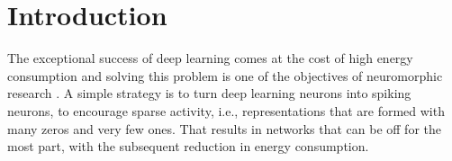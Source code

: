 

\section{Introduction}





The exceptional success of deep learning comes at the cost of high energy consumption \cite{henderson2020towards} and solving this problem is one of the objectives of neuromorphic research \cite{blouw2019benchmarking, 9395703}. 
A simple strategy is to turn deep learning neurons into spiking neurons, to encourage sparse activity, i.e., representations that are formed with many zeros and very few ones. That results in networks that can be off for the most part, with the subsequent reduction in energy consumption.

